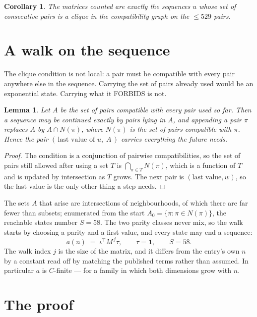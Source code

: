 \documentclass[11pt,a4paper]{article}
\theoremstyle{plain}
\newtheorem{lemma}[theorem]{Lemma}
\newtheorem{corollary}[theorem]{Corollary}
\theoremstyle{definition}
\begin{document}
\begin{corollary}
The matrices counted are exactly the sequences $u$ whose set of consecutive pairs is a clique in
the compatibility graph on the $\le 529$ pairs.
\end{corollary}

\section{A walk on the sequence}

The clique condition is not local: a pair must be compatible with every pair anywhere else in
the sequence. Carrying the set of pairs already used would be an exponential state. Carrying
what it FORBIDS is not.

\begin{lemma}\label{lem:lump}
Let $A$ be the set of pairs compatible with every pair used so far. Then a sequence may be
continued exactly by pairs lying in $A$, and appending a pair $\pi$ replaces $A$ by
$A\cap N(\pi)$, where $N(\pi)$ is the set of pairs compatible with $\pi$. Hence the pair
$(\,\text{last value of }u,\;A\,)$ carries everything the future needs.
\end{lemma}

\begin{proof}
The condition is a conjunction of pairwise compatibilities, so the set of pairs still allowed
after using a set $T$ is $\bigcap_{\pi\in T}N(\pi)$, which is a function of $T$ and is updated
by intersection as $T$ grows. The next pair is $(\text{last value},w)$, so the last value is
the only other thing a step needs.
\end{proof}

The sets $A$ that arise are intersections of neighbourhoods, of which there are far fewer than
subsets; enumerated from the start $A_0=\{\pi:\pi\in N(\pi)\}$, the reachable states number
$S=58$. The two parity classes never mix, so the walk starts by choosing a parity and a first
value, and every state may end a sequence:
\[
a(n)\;=\;\iota^{\!\top}M^{\,j}\tau ,\qquad \tau=\mathbf{1},\qquad S=58.
\]
The walk index $j$ is the size of the matrix, and it differs from the entry's own $n$ by a
constant read off by matching the published terms rather than assumed. In particular $a$ is
$C$-finite --- for a family in which both dimensions grow with $n$.

\section{The proof}
\end{document}
